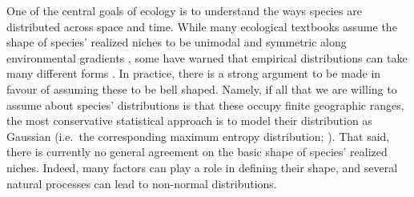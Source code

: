\documentclass[11pt, a4paper]{article}
\begin{document}
One of the central goals of ecology is to understand the ways species are distributed across space and time. While many ecological textbooks assume the shape of species' realized niches to be unimodal and symmetric along environmental gradients \citep{krebsEcologyExperimentalAnalysis1972}, some have warned that empirical distributions can take many different forms \citep{austinModelsAnalysisSpecies1987, austinSpatialPredictionSpecies2002, abundant-centre-hypothesis}. In practice, there is a strong argument to be made in favour of assuming these to be bell shaped. Namely, if all that we are willing to assume about species' distributions is that these occupy finite geographic ranges, the most conservative statistical approach is to model their distribution as Gaussian (i.e.~the corresponding maximum entropy distribution; \citealt{frankCommonPatternsNature2009}). That said, there is currently no general agreement on the basic shape of species' realized niches. Indeed, many factors can play a role in defining their shape, and several natural processes can lead to non-normal distributions.

\end{document}
